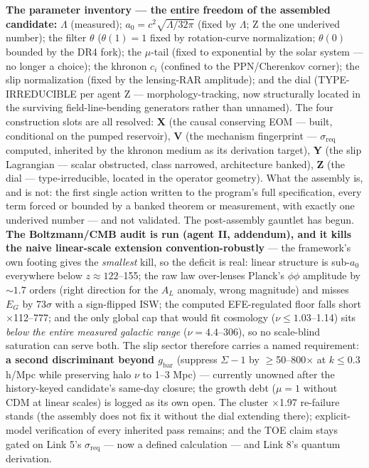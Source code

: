 \documentclass[11pt,a4paper]{article}
\begin{document}
\textbf{The parameter inventory --- the entire freedom of the assembled candidate:} $\Lambda$ (measured); $a_0 = c^2\sqrt{\Lambda/32\pi}$ (fixed by $\Lambda$; Z the one underived number); the filter $\theta$ ($\theta(1) = 1$ fixed by rotation-curve normalization; $\theta(0)$ bounded by the DR4 fork); the $\mu$-tail (fixed to exponential by the solar system --- no longer a choice); the khronon $c_i$ (confined to the PPN/Cherenkov corner); the slip normalization (fixed by the lensing-RAR amplitude); and the dial (TYPE-IRREDUCIBLE per agent Z --- morphology-tracking, now structurally located in the surviving field-line-bending generators rather than unnamed). The four construction slots are all resolved: \textbf{X} (the causal conserving EOM --- built, conditional on the pumped reservoir), \textbf{V} (the mechanism fingerprint --- $\sigma_{\mathrm{req}}$ computed, inherited by the khronon medium as its derivation target), \textbf{Y} (the slip Lagrangian --- scalar obstructed, class narrowed, architecture banked), \textbf{Z} (the dial --- type-irreducible, located in the operator geometry). What the assembly is, and is not: the first single action written to the program's full specification, every term forced or bounded by a banked theorem or measurement, with exactly one underived number --- and not validated. The post-assembly gauntlet has begun. \textbf{The Boltzmann/CMB audit is run (agent II, addendum), and it kills the naive linear-scale extension convention-robustly} --- the framework's own footing gives the \emph{smallest} kill, so the deficit is real: linear structure is sub-$a_0$ everywhere below $z \approx 122$--155; the raw law over-lenses Planck's $\phi\phi$ amplitude by ${\sim}1.7$ orders (right direction for the $A_L$ anomaly, wrong magnitude) and misses $E_G$ by 73$\sigma$ with a sign-flipped ISW; the computed EFE-regulated floor falls short $\times$112--777; and the only global cap that would fit cosmology ($\nu \le 1.03$--1.14) sits \emph{below the entire measured galactic range} ($\nu = 4.4$--306), so no scale-blind saturation can serve both. The slip sector therefore carries a named requirement: \textbf{a second discriminant beyond $g_{\mathrm{bar}}$} (suppress $\Sigma{-}1$ by $\ge$50--800$\times$ at $k \le 0.3$ h/Mpc while preserving halo $\nu$ to 1--3 Mpc) --- currently unowned after the history-keyed candidate's same-day closure; the growth debt ($\mu = 1$ without CDM at linear scales) is logged as its own open. The cluster $\times$1.97 re-failure stands (the assembly does not fix it without the dial extending there); explicit-model verification of every inherited pass remains; and the TOE claim stays gated on Link 5's $\sigma_{\mathrm{req}}$ --- now a defined calculation --- and Link 8's quantum derivation.
\end{document}
